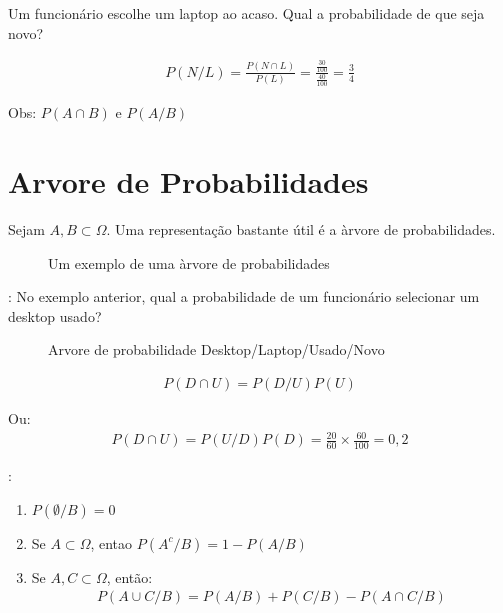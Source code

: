 \begin{description}
\begin{description}
        Um funcionário escolhe um laptop ao acaso. Qual a probabilidade de que seja novo?

      \item[Resolução:]


        \begin{align*}
          P(N/L)= \frac{P(N \cap L)}{P(L)}= \frac{\frac{30}{100}}{\frac{40}{100}}=\frac{3}{4}
        \end{align*}

        Obs: $P(A \cap B)$ e $P(A/B)$
    \end{description}
    \section{Arvore de Probabilidades}

    Sejam $A,B \subset \Omega$. Uma representação bastante útil é a àrvore de probabilidades.
    \begin{description}
      \begin{figure}[H]
        \centering
        
        \label{fig:17}
        \caption{Um exemplo de uma àrvore de probabilidades}
      \end{figure}

    \item[Exemplo]: No exemplo anterior, qual a probabilidade de um funcionário selecionar um 
      desktop usado?
      \begin{figure}[H]
        \centering
        
        \caption{Arvore de probabilidade Desktop/Laptop/Usado/Novo }
        \label{fig:18}
      \end{figure}
      \begin{align*}
        P(D \cap U)= P(D/U)P(U)
      \end{align*}

      Ou:
      \begin{align*}
        P(D \cap U)= P(U/D)P(D)= \frac{20}{60}\times \frac{60}{100}= 0,2
      \end{align*}

    \item [Algumas propriedades]:
      \begin{enumerate}[label=(\alph*)]
        \item $P(\emptyset / B)=0$
        \item Se $A \subset \Omega$, entao $P(A^c / B)= 1-P(A/B)$
        \item Se $A,C \subset \Omega$, então:
          \begin{align}
            P(A \cup C / B)= P(A/B)+ P(C/B) - P(A \cap C/B)
          \end{align}
      \end{enumerate}


\end{description}
\end{description}
